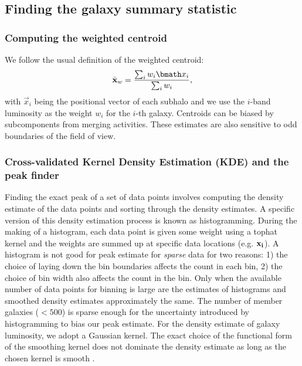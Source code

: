 \subsection{Finding the galaxy summary statistic }
\subsubsection{Computing the weighted centroid}
\label{subsubsec:weighted_centroid}
We follow the usual definition of the weighted centroid: 
\begin{equation}
	\bar{\bf x}_w = \frac{\sum_i w_i \vec{x}_i}{\sum_i w_i},
\end{equation}
with $\vec{x}_i$ being the positional vector of each subhalo 
and we use the $i$-band luminosity 
as the weight $w_i$ for the $i$-th galaxy.
Centroids can be biased by subcomponents from merging activities. 
These estimates are also sensitive to odd boundaries 
of the field of view.

\subsubsection{Cross-validated Kernel Density Estimation (KDE) and the peak finder} 
\label{subsubsec:KDE}
Finding the exact peak of a set of data points 
involves computing the density estimate of the data points and sorting through
the density estimates. A specific version of this density estimation process is
known as histogramming. During the making of a histogram, each data point is
given some weight using a tophat kernel and the weights are summed up at
specific data locations (e.g. $\bf{x}_i$). 
A histogram is not good for peak estimate for {\it sparse} data for two reasons: 1) the
choice of laying down the bin boundaries affects the count in each bin, 2) the choice of
bin width also affects the count in the bin. Only when the available number of data points
for binning is large are the estimates of histograms and smoothed density
estimates approximately the same. The number of member galaxies ($< 500$) 
is sparse enough for the uncertainty introduced by histogramming to bias our
peak estimate. For the density estimate of galaxy luminosity, 
we adopt a Gaussian kernel. 
The exact choice of the functional form of the smoothing kernel does
not dominate the density estimate as long as the chosen kernel is
smooth \citep{Feigelson2014}. 

